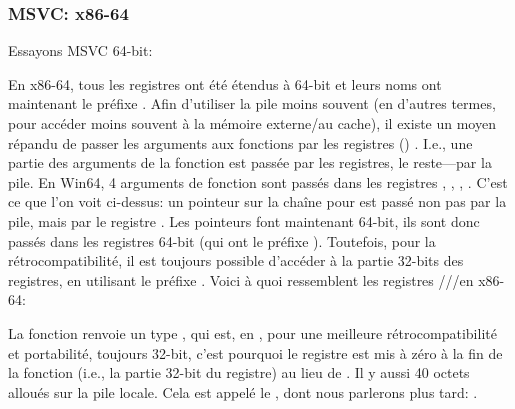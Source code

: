\subsubsection{MSVC: x86-64}

Essayons MSVC 64-bit:




En x86-64, tous les registres ont été étendus à 64-bit et leurs noms ont maintenant le préfixe .
Afin d'utiliser la pile moins souvent (en d'autres termes, pour accéder moins souvent à la mémoire externe/au cache),
il existe un moyen répandu de passer les arguments aux fonctions par les registres () .
I.e., une partie des arguments de la fonction est passée par les registres, le reste---par la pile.
En Win64, 4 arguments de fonction sont passés dans les registres \RCX, \RDX, , .
C'est ce que l'on voit ci-dessus: un pointeur sur la chaîne pour \printf est passé non pas par la pile,
mais par le registre \RCX.
Les pointeurs font maintenant 64-bit, ils sont donc passés dans les registres 64-bit (qui ont le préfixe ).
Toutefois, pour la rétrocompatibilité, il est toujours possible d'accéder à la partie 32-bits des registres,
en utilisant le préfixe .
Voici à quoi ressemblent les registres \RAX/\EAX/\AX/\AL en x86-64:


La fonction \main renvoie un type \Tint{}, qui est, en \CCpp, pour une meilleure rétrocompatibilité
et portabilité, toujours 32-bit, c'est pourquoi le registre \EAX est mis à zéro à la fin de la fonction (i.e., la
partie 32-bit du registre) au lieu de \RAX{}.
Il y aussi 40 octets alloués sur la pile locale.
Cela est appelé le , dont nous parlerons plus tard: .
